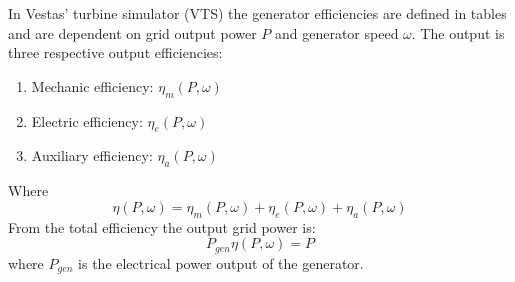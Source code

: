In Vestas' turbine simulator (VTS) the generator efficiencies are defined in tables and are dependent on grid output power $ P $ and generator speed $ \omega $. The output is three respective output efficiencies: 
\begin{enumerate}
	\item Mechanic efficiency: $ \eta_m(P,\omega) $
	\item Electric efficiency: $ \eta_e(P,\omega) $
	\item Auxiliary efficiency: $ \eta_a(P,\omega) $
\end{enumerate}
Where 
\begin{equation}\label{eq:wtLin_gen_effi}
	\eta(P,\omega) = \eta_m(P,\omega) + \eta_e(P,\omega) + \eta_a(P,\omega)
\end{equation}
From the total efficiency the output grid power is:
\begin{equation}\label{eq:wtLin_gen_elec_pow}
	P_{gen} \eta(P,\omega) = P
\end{equation}
where $ P_{gen} $ is the electrical power output of the generator.

